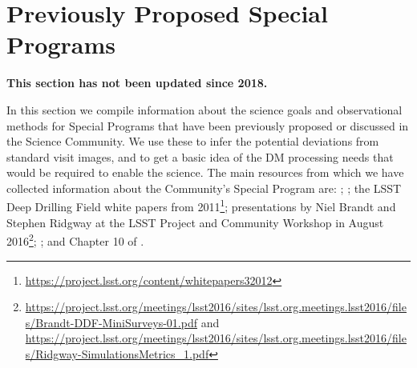 \documentclass[DM,lsstdoc,toc]{lsstdoc}
\begin{document}






\clearpage
\section{Previously Proposed Special Programs}\label{ssec:proc_datadiv_prev}

{\bf This section has not been updated since 2018.}

In this section we compile information about the science goals and observational methods for Special Programs that have been previously proposed or discussed in the Science Community. We use these to infer the potential deviations from standard visit images, and to get a basic idea of the DM processing needs that would be required to enable the science. The main resources from which we have collected information about the Community's Special Program are: \citep{2008arXiv0805.2366I}; \citep{LPM-17}; the LSST Deep Drilling Field white papers from 2011\footnote{\url{https://project.lsst.org/content/whitepapers32012}}; presentations by Niel Brandt and Stephen Ridgway at the LSST Project and Community Workshop in August 2016\footnote{\url{https://project.lsst.org/meetings/lsst2016/sites/lsst.org.meetings.lsst2016/files/Brandt-DDF-MiniSurveys-01.pdf} and \url{https://project.lsst.org/meetings/lsst2016/sites/lsst.org.meetings.lsst2016/files/Ridgway-SimulationsMetrics_1.pdf}}; \citep{2013arXiv1304.3455G}; and Chapter 10 of \citep{2017arXiv170804058L}.
\end{document}
